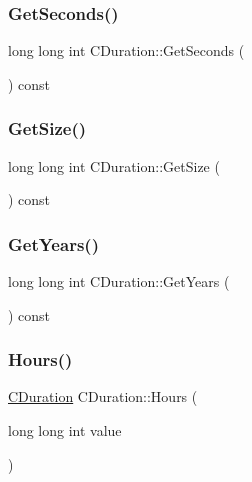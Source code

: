 \subsubsection{\texorpdfstring{Get\+Seconds()}{GetSeconds()}}
{\footnotesize\ttfamily long long int C\+Duration\+::\+Get\+Seconds (\begin{DoxyParamCaption}{ }\end{DoxyParamCaption}) const\hspace{0.3cm}{\ttfamily [inline]}}

\mbox{\label{class_c_duration_ae7411129a262f6893dd93c2143aa68c7}} 
\subsubsection{\texorpdfstring{Get\+Size()}{GetSize()}}
{\footnotesize\ttfamily long long int C\+Duration\+::\+Get\+Size (\begin{DoxyParamCaption}{ }\end{DoxyParamCaption}) const\hspace{0.3cm}{\ttfamily [inline]}}

\mbox{\label{class_c_duration_a41b44af669456e4e24fa39cd0d920d3b}} 
\subsubsection{\texorpdfstring{Get\+Years()}{GetYears()}}
{\footnotesize\ttfamily long long int C\+Duration\+::\+Get\+Years (\begin{DoxyParamCaption}{ }\end{DoxyParamCaption}) const\hspace{0.3cm}{\ttfamily [inline]}}

\mbox{\label{class_c_duration_ab4cd5a25444b7fe08b780958e2a6db0d}} 
\subsubsection{\texorpdfstring{Hours()}{Hours()}}
{\footnotesize\ttfamily \mbox{\hyperlink{class_c_duration}{C\+Duration}} C\+Duration\+::\+Hours (\begin{DoxyParamCaption}\item[{long long int}]{value }\end{DoxyParamCaption})\hspace{0.3cm}{\ttfamily [static]}}

